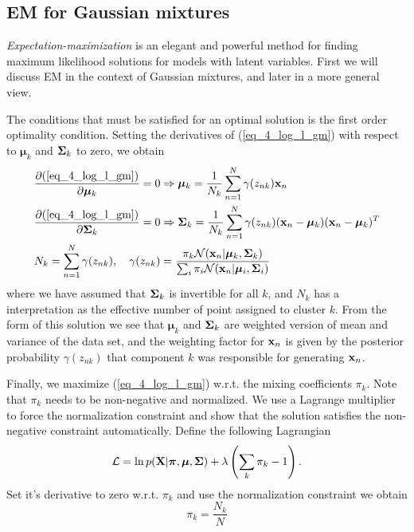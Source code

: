 \documentclass[../book-template.tex]{subfiles}
\begin{document}
\subsection{EM for Gaussian mixtures}
\emph{Expectation-maximization} is an elegant and powerful method for finding maximum likelihood solutions for models with latent variables. First we will discuss EM in the context of Gaussian mixtures, and later in a more general view.
\par The conditions that must be satisfied for an optimal solution is the first order optimality condition. Setting the derivatives of (\ref{eq_4_log_l_gm}) with respect to $\bm{\mu}_k$ and ${\bf \Sigma}_k$ to zero, we obtain
\begin{align}
	\label{eq_4_mu}&\frac{\partial (\ref{eq_4_log_l_gm})}{\partial \bm{\mu}_k}=0\Rightarrow \bm{\mu}_k = \frac{1}{N_k}\sum_{n=1}^{N}\gamma(z_{nk}){\bf x}_n\\
	 \label{eq_4_sigma}&\frac{\partial (\ref{eq_4_log_l_gm})}{\partial {\bf \Sigma}_k}=0\Rightarrow {\bf \Sigma}_k=\frac{1}{N_k}\sum_{n=1}^{N}\gamma(z_{nk}) ({\bf x}_n-\bm{\mu}_k)({\bf x}_n-\bm{\mu}_k)^T\\
	 \label{eq_4_gamma}&N_k = \sum_{n=1}^{N}\gamma(z_{nk}), \quad\gamma(z_{nk}) = \frac{\pi_k \mathcal{N}({\bf x}_n|\bm{\mu}_k,{\bf \Sigma}_k)}{\sum_i\pi_i \mathcal{N}({\bf x}_n|\bm{\mu}_i,{\bf \Sigma}_i)} 
\end{align}
where we have assumed that ${\bf \Sigma}_k$ is invertible for all $k$, and $N_k$ has a interpretation as the effective number of point assigned to cluster $k$. From the form of this solution we see that $\bm{\mu}_k$ and ${\bf \Sigma}_k$ are weighted version of mean and variance of the data set, and the weighting factor for ${\bf x}_n$ is given by the posterior probability $\gamma(z_{nk})$ that component $k$ was responsible for generating ${\bf x}_n$.
\par Finally, we maximize (\ref{eq_4_log_l_gm}) w.r.t. the mixing coefficients $\pi_k$. Note that $\pi_k$ needs to be non-negative and normalized. We use a Lagrange multiplier to force the normalization constraint and show that the solution satisfies the non-negative constraint automatically. Define the following Lagrangian
\begin{equation*}
	\mathcal{L}=\ln p({\bf X}|\bm{\pi},\bm{\mu},{\bf \Sigma}) + \lambda\left(\sum_k \pi_k-1\right).
\end{equation*}
Set it's derivative to zero w.r.t. $\pi_k$ and use the normalization constraint we obtain
\begin{equation}\label{eq_4_pi}
	\pi_k = \frac{N_k}{N} 
\end{equation}
\end{document}

